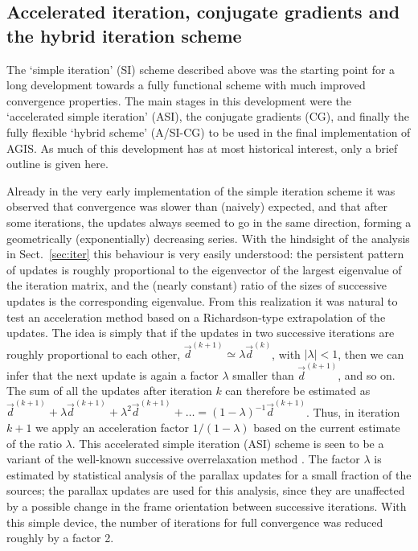 \documentclass[structabstract]{aa}
\begin{document}
\subsection{Accelerated iteration, conjugate gradients and the hybrid iteration scheme}\label{sec:CG}

The `simple iteration' (SI) scheme described above was the starting point for a long
development towards a fully functional scheme with much improved convergence
properties. The main stages in this development were the `accelerated simple
iteration' (ASI), the conjugate gradients (CG), and finally the fully flexible `hybrid 
scheme' (A/SI-CG) to be used in the final implementation of AGIS. As much of this
development has at most historical interest, only a brief outline is given here.

Already in the very early implementation of the simple iteration scheme it was observed that
convergence was slower than (naively) expected, and that after some iterations,
the updates always seemed to go in the same direction, forming a geometrically
(exponentially) decreasing series. With the hindsight of the analysis in  
Sect.~\ref{sec:iter} this behaviour is very easily understood: the persistent pattern 
of updates is roughly proportional to the eigenvector of the largest eigenvalue
of the iteration matrix, and the (nearly constant) ratio of the sizes of successive
updates is the corresponding eigenvalue. From this realization it was natural to
test an acceleration method based on a Richardson-type extrapolation of the
updates. The idea is simply that if the updates in two successive iterations are
roughly proportional to each other, $\vec{d}^{(k+1)}\simeq\lambda\vec{d}^{(k)}$,
with $|\lambda| < 1$, then we can infer that the next update is again a factor
$\lambda$ smaller than $\vec{d}^{(k+1)}$, and so on. The sum of all the
updates after iteration $k$ can therefore be estimated as $\vec{d}^{(k+1)}+
\lambda\vec{d}^{(k+1)}+\lambda^2\vec{d}^{(k+1)}+\dots=
(1-\lambda)^{-1}\vec{d}^{(k+1)}$. Thus, in iteration $k+1$ we apply an
acceleration factor $1/(1-\lambda)$ based on the current estimate of the ratio
$\lambda$. This accelerated simple iteration (ASI) scheme is seen 
to be a variant of the well-known successive overrelaxation method \citep{axelsson96}.
The factor $\lambda$ is estimated by statistical analysis of the parallax updates 
for a small fraction of the sources; the parallax updates are used for this analysis, 
since they are unaffected by a possible change in the frame orientation between 
successive iterations. With this simple device, the number of iterations for full 
convergence was reduced roughly by a factor 2.
\end{document}
